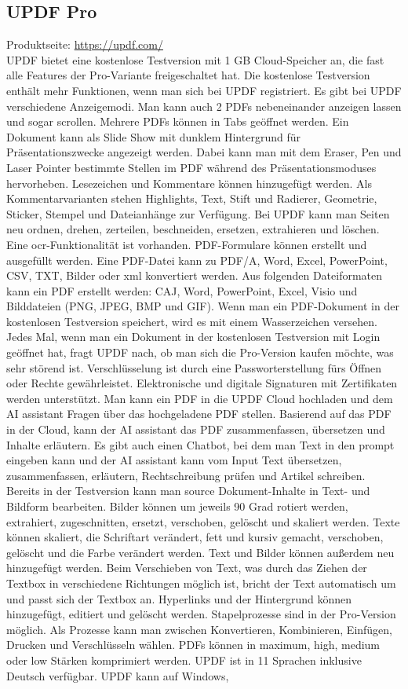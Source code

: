 \subsection{UPDF Pro}
Produktseite: \url{https://updf.com/} \\
UPDF bietet eine kostenlose Testversion mit 1 GB Cloud-Speicher an, die fast alle Features der Pro-Variante freigeschaltet hat. Die kostenlose Testversion enthält mehr Funktionen, wenn man sich bei UPDF registriert. Es gibt bei UPDF verschiedene Anzeigemodi. Man kann auch 2 PDFs nebeneinander anzeigen lassen und sogar scrollen. Mehrere PDFs können in Tabs geöffnet werden. Ein Dokument kann als Slide Show mit dunklem Hintergrund für Präsentationszwecke angezeigt werden. Dabei kann man mit dem Eraser, Pen und Laser Pointer bestimmte Stellen im PDF während des Präsentationsmoduses hervorheben. Lesezeichen und Kommentare können hinzugefügt werden. Als Kommentarvarianten stehen Highlights, Text, Stift und Radierer, Geometrie, Sticker, Stempel und Dateianhänge zur Verfügung. Bei UPDF kann man Seiten neu ordnen, drehen, zerteilen, beschneiden, ersetzen, extrahieren und löschen. Eine \gls{ocr}-Funktionalität ist vorhanden. PDF-Formulare können erstellt und ausgefüllt werden. Eine PDF-Datei kann zu PDF/A, Word, Excel, PowerPoint, CSV, TXT, Bilder oder \gls{xml} konvertiert werden. Aus folgenden Dateiformaten kann ein PDF erstellt werden: CAJ, Word, PowerPoint, Excel, Visio und Bilddateien (PNG, JPEG, BMP und GIF). Wenn man ein PDF-Dokument in der kostenlosen Testversion speichert, wird es mit einem Wasserzeichen versehen. Jedes Mal, wenn man ein Dokument in der kostenlosen Testversion mit Login geöffnet hat, fragt UPDF nach, ob man sich die Pro-Version kaufen möchte, was sehr störend ist. Verschlüsselung ist durch eine Passworterstellung fürs Öffnen oder Rechte gewährleistet. Elektronische und digitale Signaturen mit Zertifikaten werden unterstützt. Man kann ein PDF in die UPDF Cloud hochladen und dem AI assistant Fragen über das hochgeladene PDF stellen. Basierend auf das PDF in der Cloud, kann der AI assistant das PDF zusammenfassen, übersetzen und Inhalte erläutern. Es gibt auch einen Chatbot, bei dem man Text in den prompt eingeben kann und der AI assistant kann vom Input Text übersetzen, zusammenfassen, erläutern, Rechtschreibung prüfen und Artikel schreiben. Bereits in der Testversion kann man source Dokument-Inhalte in Text- und Bildform bearbeiten. Bilder können um jeweils 90 Grad rotiert werden, extrahiert, zugeschnitten, ersetzt, verschoben, gelöscht und skaliert werden. Texte können skaliert, die Schriftart verändert, fett und kursiv gemacht, verschoben, gelöscht und die Farbe verändert werden. Text und Bilder können außerdem neu hinzugefügt werden. Beim Verschieben von Text, was durch das Ziehen der Textbox in verschiedene Richtungen möglich ist, bricht der Text automatisch um und passt sich der Textbox an. Hyperlinks und der Hintergrund können hinzugefügt, editiert und gelöscht werden. Stapelprozesse sind in der Pro-Version möglich. Als Prozesse kann man zwischen Konvertieren, Kombinieren, Einfügen, Drucken und Verschlüsseln wählen. PDFs können in maximum, high, medium oder low Stärken komprimiert werden. UPDF ist in 11 Sprachen inklusive Deutsch verfügbar. UPDF kann auf Windows, 